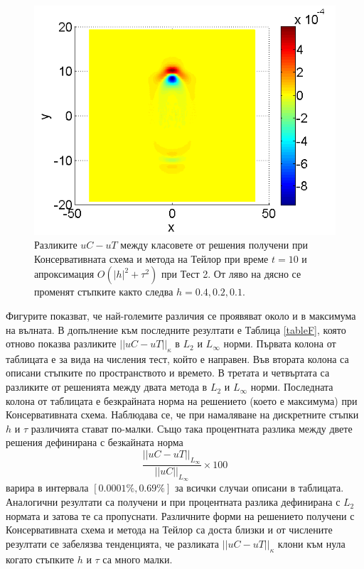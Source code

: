 \documentclass[a4paper]{article}
\theoremstyle{remark}
\begin{document}
\begin{figure}[ht]
\begin{minipage}[b]{0.32\linewidth}
		\includegraphics[width=\linewidth]{SolutionDiff/TaylorZeroBndVsEnergySave_128_ZB2_bt1_c090_h010_O(h^2).png}
	\end{minipage}
\caption{Разликите $uC - uT$  между класовете от решения получени при Консервативната схема и метода на Тейлор при време $t=10$ и апроксимация $O(|h|^2 + \tau^2)$ при Тест 2. От ляво на дясно се променят стъпките както следва $h=0.4, 0.2, 0.1$.}
\label{Test2_Diff}
\end{figure}
\FloatBarrier
Фигурите показват, че най-големите различия се проявяват около и в максимума на вълната. В допълнение към последните резултати е Таблица \ref{tableF}, която отново показва разликите $||uC - uT||_\kappa$ в  $L_2$ и ${L_\infty}$ норми. Първата колона от таблицата е за вида на числения тест, който е направен. Във втората колона са описани стъпките по пространството и времето. В третата и четвъртата са разликите от решенията между двата метода в $L_2$ и ${L_\infty}$ норми. Последната колона от таблицата е безкрайната норма на решението (което е максимума) при Консервативната схема. Наблюдава се, че при намаляване на дискретните стъпки $h$ и $\tau$ различията стават по-малки. Също така процентната разлика между двете решения дефинирана с безкайната норма
$$\frac{ ||uC - uT||_{L_\infty}} { ||uC||_{L_\infty} } \times 100$$
варира в интервала $[0.0001\%, 0.69\%]$ за всички случаи описани в таблицата. Аналогични резултати са получени и при процентната разлика дефинирана с $L_2$ нормата и затова те са пропуснати. Различните форми на решението получени с Консервативната схема и метода на Тейлор са доста близки и от числените резултати се забелязва тенденцията, че разликата $||uC - uT||_\kappa$ клони към нула когато стъпките $h$ и $\tau$ са много малки.
\end{document}
